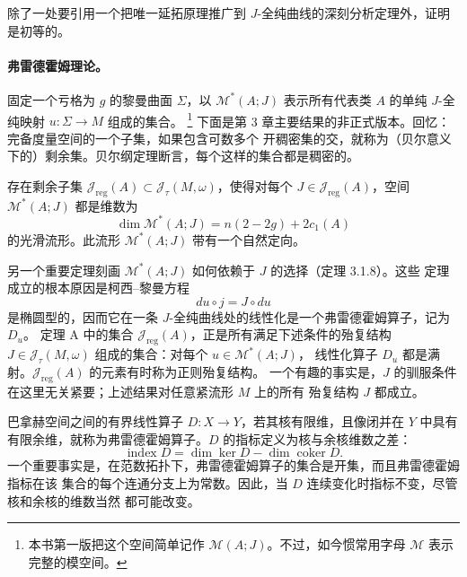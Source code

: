 除了一处要引用一个把唯一延拓原理推广到 $J$-全纯曲线的深刻分析定理外，证明是初等的。

\paragraph{弗雷德霍姆理论。}
固定一个亏格为 $g$ 的黎曼曲面 $\Sigma$，以 $\mathcal M^*(A;J)$ 表示所有代表类 $A$
的单纯 $J$-全纯映射 $u:\Sigma\to M$ 组成的集合。
\footnote{本书第一版把这个空间简单记作 $\mathcal M(A;J)$。不过，如今惯常用字母
$\mathcal M$ 表示完整的模空间。}
下面是第 3 章主要结果的非正式版本。回忆：完备度量空间的一个子集，如果包含可数多个
开稠密集的交，就称为（贝尔意义下的）剩余集。贝尔纲定理断言，每个这样的集合都是稠密的。

\begin{namedtheorem}[A]
存在剩余子集
$\mathcal J_{\mathrm{reg}}(A)\subset\mathcal J_\tau(M,\omega)$，使得对每个
$J\in\mathcal J_{\mathrm{reg}}(A)$，空间 $\mathcal M^*(A;J)$ 都是维数为
\[
  \dim\mathcal M^*(A;J)=n(2-2g)+2c_1(A)
\]
的光滑流形。此流形 $\mathcal M^*(A;J)$ 带有一个自然定向。
\end{namedtheorem}

另一个重要定理刻画 $\mathcal M^*(A;J)$ 如何依赖于 $J$ 的选择（定理 3.1.8）。这些
定理成立的根本原因是柯西--黎曼方程
\[
  du\circ j=J\circ du
\]
是椭圆型的，因而它在一条 $J$-全纯曲线处的线性化是一个弗雷德霍姆算子，记为 $D_u$。
定理 A 中的集合 $\mathcal J_{\mathrm{reg}}(A)$，正是所有满足下述条件的殆复结构
$J\in\mathcal J_\tau(M,\omega)$ 组成的集合：对每个 $u\in\mathcal M^*(A;J)$，
线性化算子 $D_u$ 都是满射。$\mathcal J_{\mathrm{reg}}(A)$ 的元素有时称为正则殆复结构。
一个有趣的事实是，$J$ 的驯服条件在这里无关紧要；上述结果对任意紧流形 $M$ 上的所有
殆复结构 $J$ 都成立。

巴拿赫空间之间的有界线性算子 $D:X\to Y$，若其核有限维，且像闭并在 $Y$ 中具有
有限余维，就称为弗雷德霍姆算子。$D$ 的指标定义为核与余核维数之差：
\[
  \operatorname{index}D=\dim\ker D-\dim\operatorname{coker}D.
\]
一个重要事实是，在范数拓扑下，弗雷德霍姆算子的集合是开集，而且弗雷德霍姆指标在该
集合的每个连通分支上为常数。因此，当 $D$ 连续变化时指标不变，尽管核和余核的维数当然
都可能改变。


